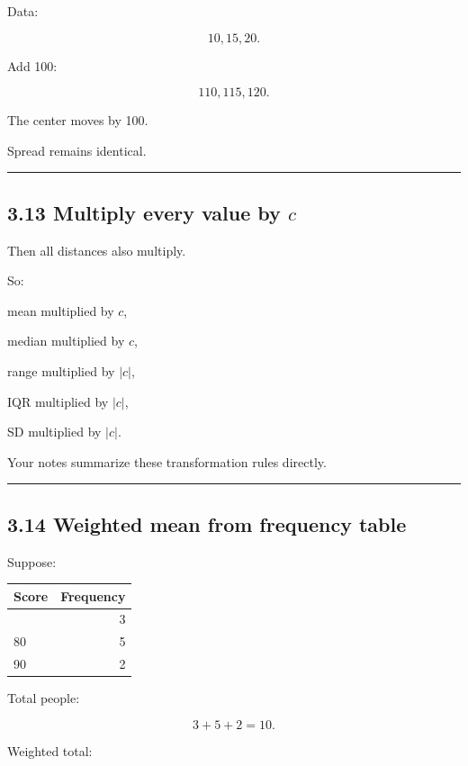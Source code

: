 \documentclass[
]{article}
\newcounter{none} %
\begin{document}
Data:

\[
10,15,20.
\]

Add 100:

\[
110,115,120.
\]

The center moves by 100.

Spread remains identical.

\begin{center}\rule{0.5\linewidth}{0.5pt}\end{center}

\subsection{\texorpdfstring{3.13 Multiply every value by
\(c\)}{3.13 Multiply every value by c}}\label{multiply-every-value-by-c}

Then all distances also multiply.

So:

mean multiplied by \(c\),

median multiplied by \(c\),

range multiplied by \(|c|\),

IQR multiplied by \(|c|\),

SD multiplied by \(|c|\).

Your notes summarize these transformation rules directly.

\begin{center}\rule{0.5\linewidth}{0.5pt}\end{center}

\subsection{3.14 Weighted mean from frequency
table}\label{weighted-mean-from-frequency-table}

Suppose:

{\def\LTcaptype{none} %
\begin{longtable}[]{@{}lr@{}}
\toprule\noalign{}
Score & Frequency \\
\midrule\noalign{}
\endhead
\bottomrule\noalign{}
\endlastfoot
70 & 3 \\
80 & 5 \\
90 & 2 \\
\end{longtable}
}

Total people:

\[
3+5+2=10.
\]

Weighted total:
\end{document}
